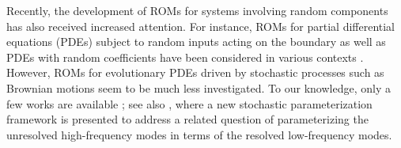 \documentclass[11pt]{amsart}
\numberwithin{equation}{section}
\newcommand{\attn}{\color{greenrb}} %
\begin{document}

Recently, the development of ROMs for systems involving random components has also received increased attention. For instance, ROMs for partial differential equations (PDEs) subject to random inputs acting on the boundary as well as PDEs with random coefficients have been considered in various contexts \cite{Chen2015,Chen2016sparse,Galbally2010,Lassila2013reduced,Boyaval2010reduced,Boyaval2009reduced,Chen2013weighted,Haasdonk2013reduced,Torlo16}. However, ROMs for evolutionary PDEs driven by stochastic processes such as Brownian motions seem to be much less investigated. To our knowledge, only a few works are available \cite{burkardt2007reduced}; see also \cite{CLW15_vol2}, where a new stochastic parameterization framework is presented to address a related question of parameterizing the unresolved high-frequency modes in terms of the resolved low-frequency modes.





 
\end{document}
